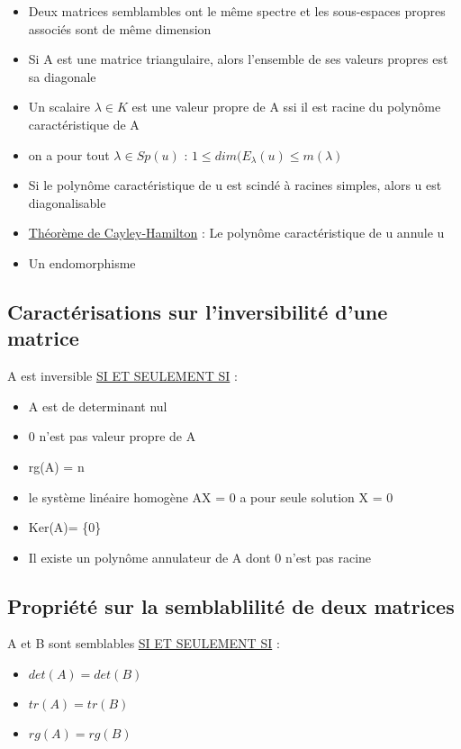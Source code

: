 \documentclass{book}
\begin{document}
\begin{itemize}[label=$\ast$]
	\item Deux matrices semblambles ont le même spectre et les sous-espaces propres associés sont de même dimension
	\item Si A est une matrice triangulaire, alors l'ensemble de ses valeurs propres est sa diagonale
	\item Un scalaire \( \lambda \in K \) est une valeur propre de A ssi il est racine du polynôme caractéristique de A
	\item on a pour tout \( \lambda \in Sp(u) \) : \( 1 \leq dim(E_{\lambda}(u) \leq m(\lambda) \)
	\item Si le polynôme caractéristique de u est scindé à racines simples, alors u est diagonalisable
	\item \underline{Théorème de Cayley-Hamilton} : Le polynôme caractéristique de u annule u
	\item Un endomorphisme 


\end{itemize}

\subsection{Caractérisations sur l'inversibilité d'une matrice}

A est inversible \underline{SI ET SEULEMENT SI} : 
\begin{itemize}[label=$\ast$]
	\item A est de determinant nul
	\item 0 n'est pas valeur propre de A
	\item rg(A) = n
	\item le système linéaire homogène AX = 0 a pour seule solution X = 0
	\item Ker(A)= \{0\}
	\item Il existe un polynôme annulateur de A dont 0 n'est pas racine

\end{itemize}

\subsection{Propriété sur la semblablilité de deux matrices}

A et B sont semblables \underline{SI ET SEULEMENT SI} : 

\begin{itemize}[label=$\ast$]
	\item \( det(A) = det(B) \)
	\item \( tr(A) = tr(B) \)
	\item \( rg(A) = rg(B) \)
\end{itemize}

\end{document}
